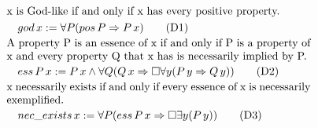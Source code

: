 \documentclass{llncs}
\begin{document}
\begin{align}
& \text{x is God-like if and only if x has every positive property.} \notag \\
& \quad god\,x := \forall P (pos\,P \Rightarrow P\,x) \tag{D1} \\ 
& \parbox[c][2em][c]{0.8\textwidth}{A property P is an essence of x if and only if P is a property of x and every property Q that x has is necessarily implied by P.}\notag \\
& \quad ess\,P\,x := P\,x \wedge \forall Q (Q\,x \Rightarrow \Box \forall y (P\,y \Rightarrow Q\,y)) \tag{D2} \\
& \parbox[c][2em][c]{0.8\textwidth}{x necessarily exists if and only if every essence of x is necessarily exemplified.} \notag \\
& \quad nec\_exists\,x := \forall P (ess\,P\,x \Rightarrow \Box \exists y (P\,y)) \tag{D3} 
\end{align}

      
\end{document}

